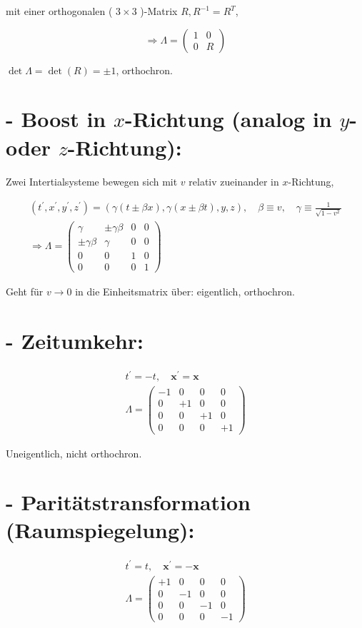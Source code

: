 \documentclass[10pt, letterpaper]{article}
\begin{document}
mit einer orthogonalen ( $3 \times 3$ )-Matrix $R, R^{-1}=R^{T}$,

$$
\Rightarrow \Lambda=\left(\begin{array}{ll}
1 & 0 \\
0 & R
\end{array}\right)
$$

$\operatorname{det} \Lambda=\operatorname{det}(R)= \pm 1$, orthochron.

\section*{- Boost in $x$-Richtung (analog in $y$-oder $z$-Richtung):}
Zwei Intertialsysteme bewegen sich mit $v$ relativ zueinander in $x$-Richtung,

$$
\begin{gathered}
\left(t^{\prime}, x^{\prime}, y^{\prime}, z^{\prime}\right)=(\gamma(t \pm \beta x), \gamma(x \pm \beta t), y, z), \quad \beta \equiv v, \quad \gamma \equiv \frac{1}{\sqrt{1-v^{2}}} \\
\Rightarrow \Lambda=\left(\begin{array}{cccc}
\gamma & \pm \gamma \beta & 0 & 0 \\
\pm \gamma \beta & \gamma & 0 & 0 \\
0 & 0 & 1 & 0 \\
0 & 0 & 0 & 1
\end{array}\right)
\end{gathered}
$$

Geht für $v \rightarrow 0$ in die Einheitsmatrix über: eigentlich, orthochron.

\section*{- Zeitumkehr:}
$$
\begin{gathered}
t^{\prime}=-t, \quad \mathbf{x}^{\prime}=\mathbf{x} \\
\Lambda=\left(\begin{array}{cccc}
-1 & 0 & 0 & 0 \\
0 & +1 & 0 & 0 \\
0 & 0 & +1 & 0 \\
0 & 0 & 0 & +1
\end{array}\right)
\end{gathered}
$$

Uneigentlich, nicht orthochron.

\section*{- Paritätstransformation (Raumspiegelung):}
$$
\begin{gathered}
t^{\prime}=t, \quad \mathbf{x}^{\prime}=-\mathbf{x} \\
\Lambda=\left(\begin{array}{cccc}
+1 & 0 & 0 & 0 \\
0 & -1 & 0 & 0 \\
0 & 0 & -1 & 0 \\
0 & 0 & 0 & -1
\end{array}\right)
\end{gathered}
$$
\end{document}
